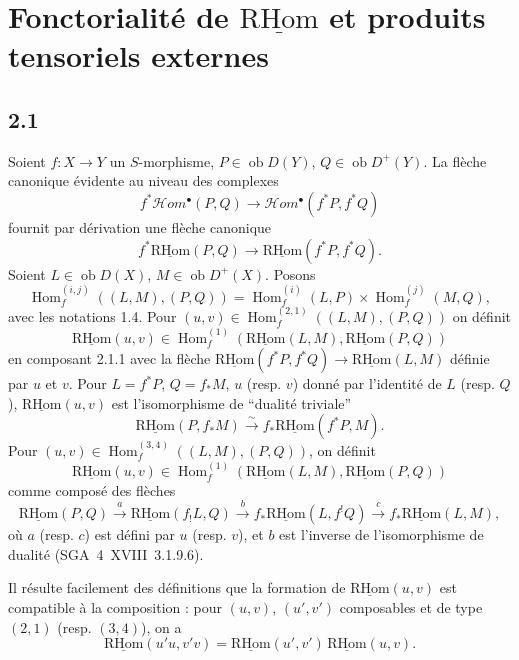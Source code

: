 \documentclass[11pt]{article}
\DeclareMathOperator{\Hom}{Hom}
\newcommand{\R}{\mathrm{R}}\newcommand{\RHomCore}{\mathrm{RHom}}
\newcommand{\ob}{\operatorname{ob}}
\providecommand{\RHom}{\RHomCore}
\providecommand{\uRHom}{\underline{\RHom}}
\providecommand{\RHom}{\RHomCore}
\providecommand{\Hom}{\operatorname{Hom}}
\providecommand{\ob}{\operatorname{ob}}
\providecommand{\RHom}{\R\mathcal{H}om}
\providecommand{\R}{\mathrm R}
\providecommand{\RHom}{\RHomCore}
\providecommand{\Hom}{\operatorname{Hom}}
\begin{document}
\section{Fonctorialité de \texorpdfstring{$\uRHom$}{RHom} et produits tensoriels externes}

\subsection*{2.1}
Soient $f:X\to Y$ un $S$-morphisme, $P\in\ob D(Y)$, $Q\in\ob D^{+}(Y)$. La flèche canonique évidente au niveau des complexes
\[
f^{*}\mathcal Hom^{\bullet}(P,Q)\longrightarrow\mathcal Hom^{\bullet}(f^{*}P,f^{*}Q)
\]
fournit par dérivation une flèche canonique
\begin{equation}\tag{2.1.1}
f^{*}\uRHom(P,Q)\longrightarrow\uRHom(f^{*}P,f^{*}Q).
\end{equation}
Soient $L\in\ob D(X)$, $M\in\ob D^{+}(X)$. Posons
\begin{equation}\tag{2.1.2}
\Hom_f^{(i,j)}((L,M),(P,Q))=\Hom_f^{(i)}(L,P)\times\Hom_f^{(j)}(M,Q),
\end{equation}
avec les notations 1.4. Pour $(u,v)\in\Hom_f^{(2,1)}((L,M),(P,Q))$ on définit
\begin{equation}\tag{2.1.3}
\uRHom(u,v)\in\Hom_f^{(1)}(\uRHom(L,M),\uRHom(P,Q))
\end{equation}
en composant 2.1.1 avec la flèche $\uRHom(f^{*}P,f^{*}Q)\to\uRHom(L,M)$ définie par $u$ et $v$. Pour $L=f^{*}P$, $Q=f_{*}M$, $u$ (resp. $v$) donné par l'identité de $L$ (resp. $Q$), $\uRHom(u,v)$ est l'isomorphisme de ``dualité triviale''
\begin{equation}\tag{2.1.4}
\uRHom(P,f_{*}M)\xrightarrow{\sim}f_{*}\uRHom(f^{*}P,M).
\end{equation}
Pour $(u,v)\in\Hom_f^{(3,4)}((L,M),(P,Q))$, on définit
\begin{equation}\tag{2.1.5}
\uRHom(u,v)\in\Hom_f^{(1)}(\uRHom(L,M),\uRHom(P,Q))
\end{equation}
comme composé des flèches
\[
\uRHom(P,Q)\xrightarrow{a}\uRHom(f_{!}L,Q)\xrightarrow{b}f_{*}\uRHom(L,f^{!}Q)\xrightarrow{c}f_{*}\uRHom(L,M),
\]
où $a$ (resp. $c$) est défini par $u$ (resp. $v$), et $b$ est l'inverse de l'isomorphisme de dualité (SGA~4~XVIII~3.1.9.6).

Il résulte facilement des définitions que la formation de $\uRHom(u,v)$ est compatible à la composition : pour $(u,v)$, $(u',v')$ composables et de type $(2,1)$ (resp. $(3,4)$), on a
\begin{equation}\tag{2.1.6}
\uRHom(u'u,v'v)=\uRHom(u',v')\,\uRHom(u,v).
\end{equation}
\end{document}
